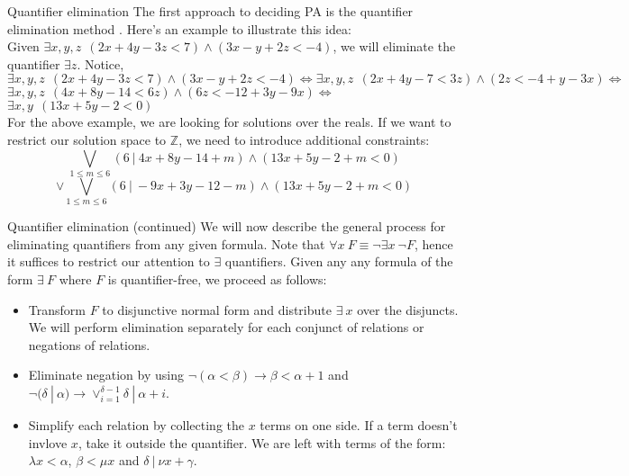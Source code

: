 \documentclass[10pt]{beamer}
\begin{document}
\begin{frame}{Quantifier elimination}
    The first approach to deciding PA is the quantifier elimination method \cite{cooper1972theorem}. 
    Here's an example to illustrate this idea:\\
    Given $\exists x,y,z \:\: (2x+4y-3z<7)\wedge (3x-y+2z<-4)$, we will eliminate the quantifier $\exists z$.
    Notice,\\ 
    $\exists x,y,z \:\: (2x+4y-3z<7)\wedge (3x-y+2z<-4) \Leftrightarrow \exists x,y,z\:\: (2x+4y-7<3z)\wedge (2z<-4+y-3x)\Leftrightarrow$\\
    $\exists x,y,z \:\: (4x+8y-14<6z)\wedge (6z<-12+3y-9x)\Leftrightarrow$ \\
    $\exists x,y \:\: (13x+5y-2<0)$\\
    For the above example, we are looking for solutions over the reals. 
    If we want to restrict our solution space to $\mathbb{Z}$, we need to introduce additional constraints:
    \[\bigvee_{1\leq m\leq 6} (6\:|\:4x+8y-14+m) \wedge (13x+5y-2+m<0)\]
    \[\vee\bigvee_{1\leq m\leq 6} (6\:|\:-9x+3y-12-m) \wedge (13x+5y-2+m<0)\]
\end{frame}
\begin{frame}{Quantifier elimination (continued)}
    We will now describe the general process for eliminating quantifiers from any given formula.
    Note that $\forall x \:F \equiv \neg \exists x \: \neg F$, hence it suffices to restrict our attention to $\exists$ quantifiers.
    Given any any formula of the form $\exists \:F$ where $F$ is quantifier-free, we proceed as follows:
    \begin{itemize}
        \item Transform $F$ to disjunctive normal form and distribute $\exists \: x$ over the disjuncts.
        We will perform elimination separately for each conjunct of relations or negations of relations.
        \item Eliminate negation by using $\neg(\alpha < \beta) \rightarrow \beta <\alpha +1$ and 
        $\neg (\delta\:|\:\alpha) \rightarrow \vee_{i=1}^{\delta-1} \delta \:|\: \alpha+i$.
        \item Simplify each relation by collecting the $x$ terms on one side. 
        If a term doesn't invlove $x$, take it outside the quantifier.
        We are left with terms of the form: $\lambda x<\alpha$, $\beta <\mu x$ and $\delta\:|\: \nu x+\gamma$.
    \end{itemize}
\end{frame}
\end{document}
